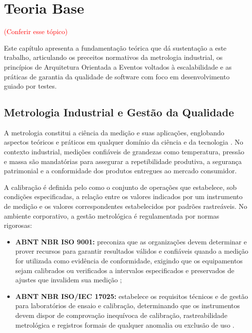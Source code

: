 \chapter{Teoria Base}

\textcolor{red}{(Conferir esse tópico)}

Este capítulo apresenta a fundamentação teórica que dá sustentação a este trabalho, articulando os preceitos normativos da metrologia industrial, os princípios de Arquitetura Orientada a Eventos voltados à escalabilidade e as práticas de garantia da qualidade de software com foco em desenvolvimento guiado por testes.

\section{Metrologia Industrial e Gestão da Qualidade}

A metrologia constitui a ciência da medição e suas aplicações, englobando aspectos teóricos e práticos em qualquer domínio da ciência e da tecnologia \cite{vim2012}. No contexto industrial, medições confiáveis de grandezas como temperatura, pressão e massa são mandatórias para assegurar a repetibilidade produtiva, a segurança patrimonial e a conformidade dos produtos entregues ao mercado consumidor.

A calibração é definida pelo  como o conjunto de operações que estabelece, sob condições especificadas, a relação entre os valores indicados por um instrumento de medição e os valores correspondentes estabelecidos por padrões rastreáveis. No ambiente corporativo, a gestão metrológica é regulamentada por normas rigorosas:
\begin{itemize}
    \item \textbf{ABNT NBR ISO 9001:} preconiza que as organizações devem determinar e prover recursos para garantir resultados válidos e confiáveis quando a medição for utilizada como evidência de conformidade, exigindo que os equipamentos sejam calibrados ou verificados a intervalos especificados e preservados de ajustes que invalidem sua medição \cite{iso9001};
    \item \textbf{ABNT NBR ISO/IEC 17025:} estabelece os requisitos técnicos e de gestão para laboratórios de ensaio e calibração, determinando que os instrumentos devem dispor de comprovação inequívoca de calibração, rastreabilidade metrológica e registros formais de qualquer anomalia ou exclusão de uso \cite{iso17025}.
\end{itemize}

